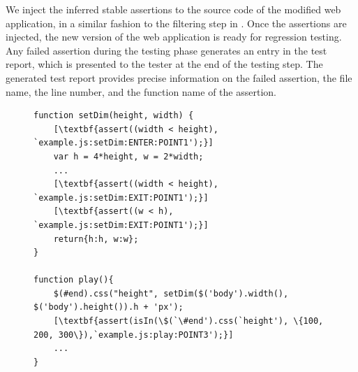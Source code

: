 We inject the inferred stable assertions to the \javascript source code of the modified web application, in a similar fashion to the filtering step in . Once the assertions are injected, the new version of the web application is ready for regression testing. Any failed assertion during the testing phase generates an entry in the test report, which is presented to the tester at the end of the testing step.
The generated test report provides precise information on the failed assertion, the file name,  the line number, and the function name of the assertion.

\begin{figure}[h]
\begin{lstlisting}
function setDim(height, width) {
	[\textbf{assert((width < height), `example.js:setDim:ENTER:POINT1');}] 			
	var h = 4*height, w = 2*width;		
	...
	[\textbf{assert((width < height), `example.js:setDim:EXIT:POINT1');}]
	[\textbf{assert((w < h), `example.js:setDim:EXIT:POINT1');}]
	return{h:h, w:w};
}

function play(){
	$(#end).css("height", setDim($('body').width(), $('body').height()).h + 'px');
	[\textbf{assert(isIn(\$(`\#end').css(`height'), \{100, 200, 300\}),`example.js:play:POINT3');}]
	...
}
\end{lstlisting}
\vspace{.2in}
\label{Fig:example_assertion}
\end{figure}


